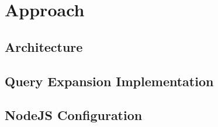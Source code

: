 \chapter{Approach}
\label{ch:approach}

\section{Architecture}

\section{Query Expansion Implementation}

\section{NodeJS Configuration}

